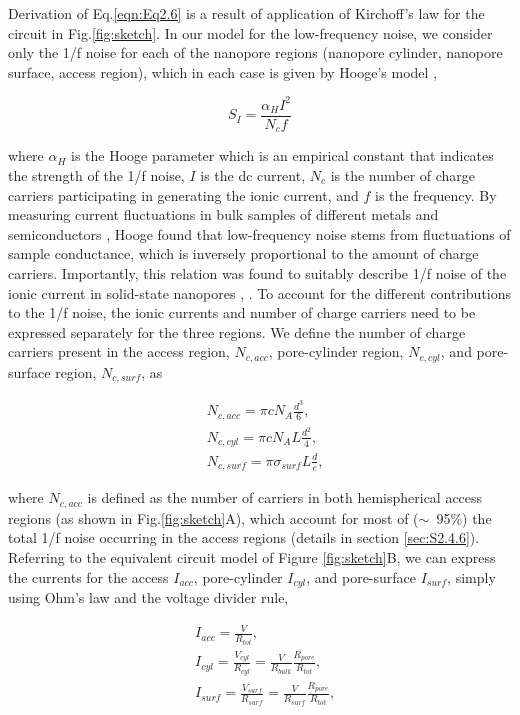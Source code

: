 \noindent Derivation of Eq.\ref{eqn:Eq2.6} is a result of application of Kirchoff’s law for the circuit in Fig.\ref{fig:sketch}. In our model for the low-frequency noise, we consider only the 1/f noise for each of the nanopore regions (nanopore cylinder, nanopore surface, access region), which in each case is given by Hooge’s model \cite{Hooge1976}, 


\begin{equation}\label{eqn:Eq2.7}
S_I=\frac{\alpha_H I^2}{N_c f}  
\end{equation}

\noindent where $\alpha_H$ is the Hooge parameter which is an empirical constant that indicates the strength of the 1/f noise, $I$ is the dc current, $N_c$ is the number of charge carriers participating in generating the ionic current, and $f$ is the frequency. By measuring current fluctuations in bulk samples of different metals and semiconductors \cite{Hooge1976}, Hooge found that low-frequency noise stems from fluctuations of sample conductance, which is inversely proportional to the amount of charge carriers. Importantly, this relation was found to suitably describe 1/f noise of the ionic current in solid-state nanopores \cite{Smeets2008}, \cite{Wen2017}. To account for the different contributions to the 1/f noise, the ionic currents and number of charge carriers need to be expressed separately for the three regions.  We define the number of charge carriers present in the access region, $N_{c,acc}$, pore-cylinder region, $N_{c,cyl}$, and pore-surface region, $N_{c,surf}$, as


 \begin{align}
\label{eqn:Eq2.8}
&N_{c,acc}=\pi cN_A\frac{d^3}{6},\\
\label{eqn:Eq2.9}
&N_{c,cyl}=\pi cN_AL\frac{d^2}{4},\\ 
\label{eqn:Eq2.10}
&N_{c,surf}=\pi \sigma_{surf}L\frac{d}{e},   
\end{align}

\noindent where $N_{c,acc}$ is defined as the number of carriers in both hemispherical access regions (as shown in Fig.\ref{fig:sketch}A), which account for most of ($\sim$~95\%) the total 1/f noise occurring in the access regions (details in section \ref{sec:S2.4.6}). Referring to the equivalent circuit model of Figure \ref{fig:sketch}B, we can express the currents for the access $I_{acc}$,  pore-cylinder $I_{cyl}$, and pore-surface $I_{surf}$, simply using Ohm’s law and the voltage divider rule,


 \begin{align}
\label{eqn:Eq2.11}
&I_{acc}=\frac{V}{R_{tot}},\\
\label{eqn:Eq2.12}
&I_{cyl}=\frac{V_{cyl}}{R_{cyl}}= \frac{V}{R_{bulk}}\frac{R_{pore}}{R_{tot}},\\ 
\label{eqn:Eq2.13}
&I_{surf}=\frac{V_{surf}}{R_{surf}}=\frac{V}{R_{surf}}\frac{R_{pore}}{R_{tot}},   
\end{align}


